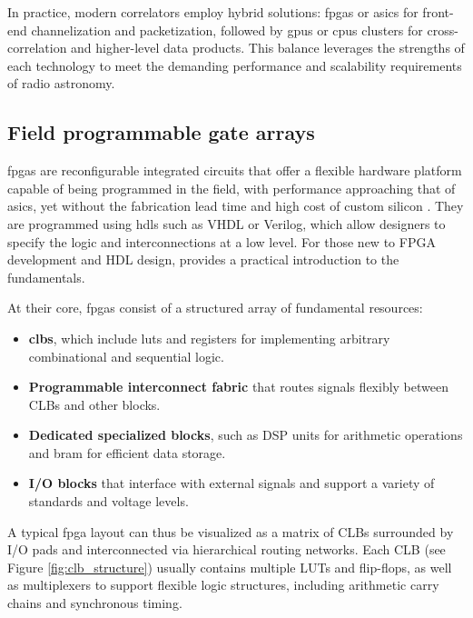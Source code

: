  
In practice, modern correlators employ hybrid solutions: \glspl{fpga} or \glspl{asic} for front-end channelization and packetization, followed by \glspl{gpu} or \glspl{cpu} clusters for cross-correlation and higher-level data products. This balance leverages the strengths of each technology to meet the demanding performance and scalability requirements of radio astronomy.

\subsection{Field programmable gate arrays}
\label{sec:fpgas}
\Glspl{fpga} are reconfigurable integrated circuits that offer a flexible hardware platform capable of being programmed in the field, with performance approaching that of \glspl{asic}, yet without the fabrication lead time and high cost of custom silicon \citep{kuon2008fpga}. They are programmed using \glspl{hdl} such as VHDL or Verilog, which allow designers to specify the logic and interconnections at a low level. For those new to FPGA development and HDL design, \citet{nandland2019fpga} provides a practical introduction to the fundamentals.

At their core, \Glspl{fpga} consist of a structured array of fundamental resources:
\begin{itemize}
  \item \textbf{\Glspl{clb}}, which include \glspl{lut} and registers for implementing arbitrary combinational and sequential logic.
  \item \textbf{Programmable interconnect fabric} that routes signals flexibly between CLBs and other blocks.
  \item \textbf{Dedicated specialized blocks}, such as DSP units for arithmetic operations and \gls{bram} for efficient data storage.
  \item \textbf{I/O blocks} that interface with external signals and support a variety of standards and voltage levels.
\end{itemize}

A typical \Gls{fpga} layout can thus be visualized as a matrix of CLBs  surrounded by I/O pads and interconnected via hierarchical routing networks. Each CLB (see Figure \ref{fig:clb_structure}) usually contains multiple LUTs and flip-flops, as well as multiplexers to support flexible logic structures, including arithmetic carry chains and synchronous timing.

